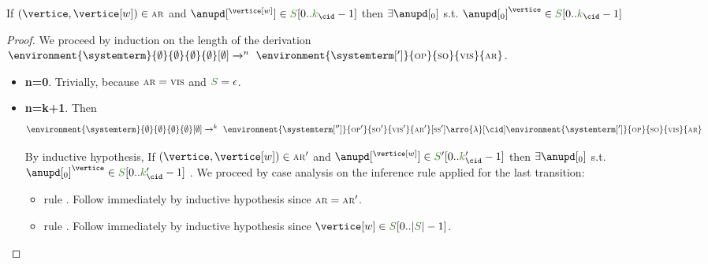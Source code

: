 \begin{lemma}\label{lemma:vertice_arb_store} 
If $(\vertice,\vertice[w])\in\arb$ and $\anupd[^{\vertice[w]}] \in \queuemessage[0 .. \tknown_{\cid} - 1]$ then $\exists \anupd[_0]$ s.t. $\anupd[_0]^{\vertice} \in \queuemessage[0 .. \tknown_{\cid}-1]$
\end{lemma}
\begin{proof}
We proceed by induction on the length of the derivation 
$\environment{\systemterm}{\emptyset}{\emptyset}{\emptyset}{\emptyset}[\emptyset] \tr{} ^n\ \environment{\systemterm[']}{\op}{\so}{\vis}{\arb}$.

\begin{itemize}
	    \item {\bf n=0}. Trivially, because $\textsc{\scriptsize{AR}}=\textsc{\scriptsize{VIS}}$ and $\queuemessage=\epsilon$.
    \item{\bf n=k+1}. Then 
      \[\environment{\systemterm}{\emptyset}{\emptyset}{\emptyset}{\emptyset}[\emptyset] 
         \tr{} ^k\ 
         \environment{\systemterm['']}{\op'}{\so'}{\vis'}{\arb'}[\sse'] 
         \arro{\lambda}[\cid]
 	\environment{\systemterm[']}{\op}{\so}{\vis}{\arb}
	 \]
	 
	By inductive hypothesis, If $(\vertice,\vertice[w])\in\arb'$ and $\anupd[^{\vertice[w]}] \in \queuemessage'[0 .. \tknown_{\cid}' - 1]$ then $\exists \anupd[_0]$ s.t. $ \anupd[_0]^{\vertice} \in \queuemessage[0 .. \tknown_{\cid}'-1]$
. We proceed by 
case analysis on the inference rule applied for the last transition:

	\begin{itemize}
      
        \item rule . Follow immediately by inductive hypothesis since $\textsc{\scriptsize{AR}} = \textsc{\scriptsize{AR}}'$.      
       
        \item rule . Follow immediately by inductive hypothesis since $\vertice[w] \in \queuemessage[0 .. |\queuemessage| - 1]$.     
        

\end{itemize}
\end{itemize}
\end{proof}
